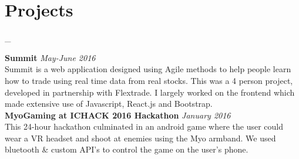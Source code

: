\documentclass[a4paper,10pt]{article}
\begin{document}
	\section*{Projects}_
	
	 \textbf{Summit} \hfill \textit{May-June 2016} \\ 
	 Summit is a web application designed using Agile methods to help people learn how to trade using real time data from real stocks. This was a 4 person project, developed in partnership with Flextrade. I largely worked on the frontend which made extensive use of Javascript, React.js and Bootstrap. \\
	
	
	\textbf{MyoGaming at ICHACK 2016 Hackathon} \hfill \textit{January 2016} \\
	This 24-hour hackathon culminated in an android game where the user could wear a VR headset and shoot at enemies using the Myo armband. We used bluetooth \& custom API's to control the game on the user's phone.

	
	
	
\end{document}
